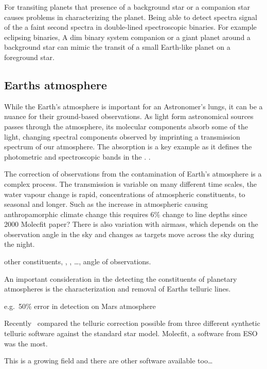 For transiting planets that presence of a background star or a companion star causes problems in characterizing the planet.
Being able to detect spectra signal of the a faint second spectra in double-lined spectroscopic binaries.
For example eclipsing binaries,
A dim binary system companion or a giant planet around a background star can mimic the transit of a small Earth-like planet on a foreground star.






\subsection{Earths atmosphere}
While the Earth's atmosphere is important for an Astronomer's lungs, it can be a nuance for their ground-based observations.
As light form astronomical sources passes through the atmosphere, its molecular components absorb some of the light, changing spectral components observed by imprinting a transmission spectrum of our atmosphere.
The  absorption is a key example as it defines the photometric and spectroscopic bands in the \nir{}. .

The correction of observations from the contamination of Earth's atmosphere is a complex process.
The transmission is variable on many different time scales, the water vapour change is rapid, concentrations of atmospheric constituents, to seasonal and longer.
Such as the increase in atmospheric  causing anthropamorphic climate change this requires 6\% change to  line depths since 2000 Molecfit paper? There is also variation with airmass, which depends on the observation angle in the sky and changes as targets move across the sky during the night.

other constituents, , ,  \ldots{}, angle of observations.

An important consideration in the detecting the constituents of planetary atmospheres is the characterization and removal of Earths telluric lines.

e.g.\ 50\% error in  detection on Mars atmosphere


Recently~\citet{ulmer-moll_telluric_2018} compared the telluric correction possible from three different synthetic telluric software against the standard star model.
Molecfit, a software from ESO was the most.

This is a growing field and there are other software available too\ldots{}


